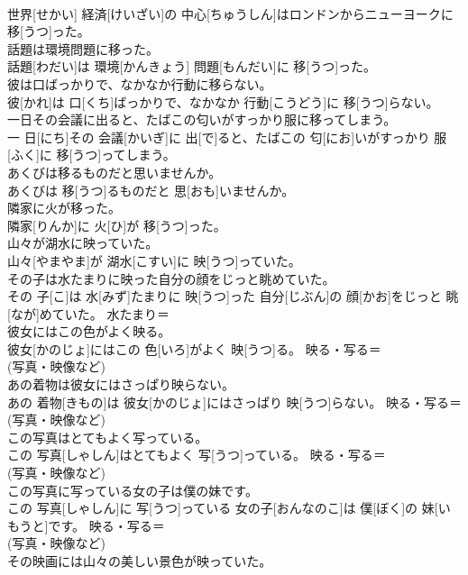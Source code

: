 \documentclass[8pt]{extreport}
\begin{document}
\begin{CJK}{UTF8}{min}
\\	世界[せかい] 経済[けいざい]の 中心[ちゅうしん]はロンドンからニューヨークに 移[うつ]った。	
\\	話題は環境問題に移った。	
\\	話題[わだい]は 環境[かんきょう] 問題[もんだい]に 移[うつ]った。	
\\	彼は口ばっかりで、なかなか行動に移らない。	
\\	彼[かれ]は 口[くち]ばっかりで、なかなか 行動[こうどう]に 移[うつ]らない。	
\\	一日その会議に出ると、たばこの匂いがすっかり服に移ってしまう。	
\\	一 日[にち]その 会議[かいぎ]に 出[で]ると、たばこの 匂[にお]いがすっかり 服[ふく]に 移[うつ]ってしまう。	
\\	あくびは移るものだと思いませんか。	
\\	あくびは 移[うつ]るものだと 思[おも]いませんか。	
\\	隣家に火が移った。	
\\	隣家[りんか]に 火[ひ]が 移[うつ]った。	
\\	山々が湖水に映っていた。	
\\	山々[やまやま]が 湖水[こすい]に 映[うつ]っていた。	
\\	その子は水たまりに映った自分の顔をじっと眺めていた。	
\\	その 子[こ]は 水[みず]たまりに 映[うつ]った 自分[じぶん]の 顔[かお]をじっと 眺[なが]めていた。	水たまり＝ 
\\	彼女にはこの色がよく映る。	
\\	彼女[かのじょ]にはこの 色[いろ]がよく 映[うつ]る。	映る・写る＝ 
\\	(写真・映像など) 
\\	あの着物は彼女にはさっぱり映らない。	
\\	あの 着物[きもの]は 彼女[かのじょ]にはさっぱり 映[うつ]らない。	映る・写る＝ 
\\	(写真・映像など) 
\\	この写真はとてもよく写っている。	
\\	この 写真[しゃしん]はとてもよく 写[うつ]っている。	映る・写る＝ 
\\	(写真・映像など) 
\\	この写真に写っている女の子は僕の妹です。	
\\	この 写真[しゃしん]に 写[うつ]っている 女の子[おんなのこ]は 僕[ぼく]の 妹[いもうと]です。	映る・写る＝ 
\\	(写真・映像など) 
\\	その映画には山々の美しい景色が映っていた。	

\end{CJK}
\end{document}
